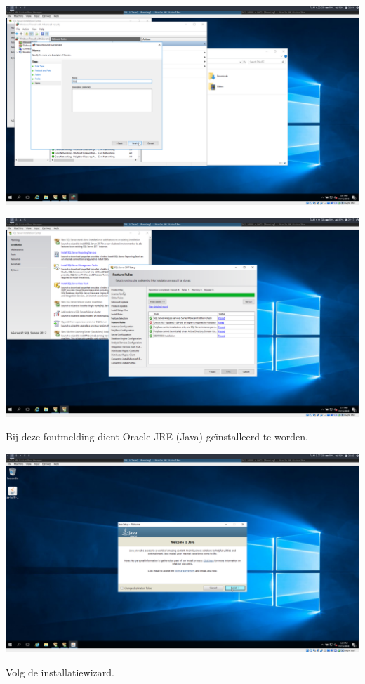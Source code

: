 \documentclass[a4paper]{article}
\begin{document}
\begin{center}
	\includegraphics[width=15cm]{Pictures/SQL/1542315679.png}
\end{center}
\begin{center}
	\includegraphics[width=15cm]{Pictures/SQL/1542316632.png}
	
	Bij deze foutmelding dient Oracle JRE (Java) geïnstalleerd te worden.
\end{center}
\begin{center}
	\includegraphics[width=15cm]{Pictures/SQL/1542316945.png}
	
	Volg de installatiewizard.
\end{center}
\end{document}

